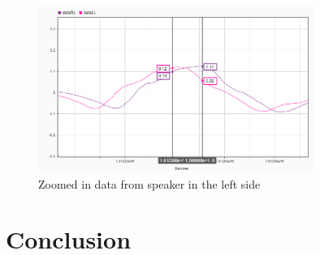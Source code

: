 \begin{figure}[htp]
	\centering
	\includegraphics[width=0.8\textwidth]{Illustrations/DataL_with_Markers.png}
	\caption{Zoomed in data from speaker in the left side}
	\label{fig:closeL}
\end{figure}

\section{Conclusion}